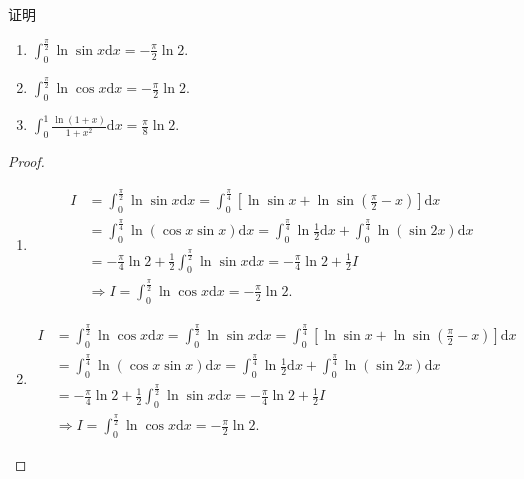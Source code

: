 \documentclass[../../main.tex]{subfiles}%
\begin{document}
\begin{proposition}\label{example:常见积分1}
证明
\begin{enumerate}
\item \(\int_{0}^{\frac{\pi}{2}} \ln\sin x\mathrm{d}x=-\frac{\pi}{2}\ln 2.\)

\item \(\int_{0}^{\frac{\pi}{2}} \ln\cos x\mathrm{d}x=-\frac{\pi}{2}\ln 2.\)

\item \(\int_{0}^{1} \frac{\ln(1 + x)}{1 + x^2}\mathrm{d}x=\frac{\pi}{8}\ln 2.\)
\end{enumerate}
\end{proposition}
\begin{proof}
\begin{enumerate}
\item \begin{align*}
I&=\int_0^{\frac{\pi}{2}}{\ln\sin x\mathrm{d}x}=\int_0^{\frac{\pi}{4}}{\left[ \ln\sin x+\ln \sin \left( \frac{\pi}{2}-x \right) \right] \mathrm{d}x}
\\
&=\int_0^{\frac{\pi}{4}}{\ln \left( \cos x\sin x \right) \mathrm{d}x}=\int_0^{\frac{\pi}{4}}{\ln \frac{1}{2}\mathrm{d}x}+\int_0^{\frac{\pi}{4}}{\ln \left( \sin 2x \right) \mathrm{d}x}
\\
&=-\frac{\pi}{4}\ln 2+\frac{1}{2}\int_0^{\frac{\pi}{2}}{\ln\sin x\mathrm{d}x}=-\frac{\pi}{4}\ln 2+\frac{1}{2}I
\\
&\Longrightarrow I=\int_0^{\frac{\pi}{2}}{\ln\cos x\mathrm{d}x}=-\frac{\pi}{2}\ln 2.
\end{align*}

\item \begin{align*}
I&=\int_0^{\frac{\pi}{2}}{\ln\cos x\mathrm{d}x}=\int_0^{\frac{\pi}{2}}{\ln\sin x\mathrm{d}x}=\int_0^{\frac{\pi}{4}}{\left[ \ln\sin x+\ln \sin \left( \frac{\pi}{2}-x \right) \right] \mathrm{d}x}
\\
&=\int_0^{\frac{\pi}{4}}{\ln \left( \cos x\sin x \right) \mathrm{d}x}=\int_0^{\frac{\pi}{4}}{\ln \frac{1}{2}\mathrm{d}x}+\int_0^{\frac{\pi}{4}}{\ln \left( \sin 2x \right) \mathrm{d}x}
\\
&=-\frac{\pi}{4}\ln 2+\frac{1}{2}\int_0^{\frac{\pi}{2}}{\ln\sin x\mathrm{d}x}=-\frac{\pi}{4}\ln 2+\frac{1}{2}I
\\
&\Longrightarrow I=\int_0^{\frac{\pi}{2}}{\ln\cos x\mathrm{d}x}=-\frac{\pi}{2}\ln 2.
\end{align*}


\end{enumerate}
\end{proof}
\end{document}
